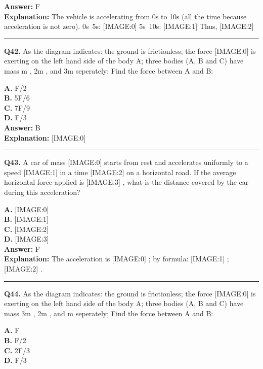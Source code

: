 \documentclass[12pt]{article}
\begin{document}
\textbf{Answer:} F \\
\textbf{Explanation:} The vehicle is accelerating from 0s to 10s (all the time because acceleration is not zero).
0s~5s:
[IMAGE:0]
5s~10s:
[IMAGE:1]
Thus,
[IMAGE:2]

\hrule
\vspace{1em}


\noindent
\textbf{Q42.} As the diagram indicates: the ground is frictionless; the force
[IMAGE:0]
is exerting on the left hand side of the body A; three bodies (A, B and C) have mass m
, 2m
, and 3m
seperately; Find the force between A and B:



\textbf{A.} F/2 \\
\textbf{B.} 5F/6 \\
\textbf{C.} 7F/9 \\
\textbf{D.} F/3 \\

\textbf{Answer:} B \\
\textbf{Explanation:} [IMAGE:0]

\hrule
\vspace{1em}


\noindent
\textbf{Q43.} A car of mass
[IMAGE:0]
starts from rest and accelerates uniformly to a speed
[IMAGE:1]
in a time
[IMAGE:2]
on a horizontal road. If the average horizontal force applied is
[IMAGE:3]
, what is the distance covered by the car during this acceleration?



\textbf{A.} [IMAGE:0] \\
\textbf{B.} [IMAGE:1] \\
\textbf{C.} [IMAGE:2] \\
\textbf{D.} [IMAGE:3] \\

\textbf{Answer:} F \\
\textbf{Explanation:} The acceleration is
[IMAGE:0]
; by formula:
[IMAGE:1]
;
[IMAGE:2]
.

\hrule
\vspace{1em}


\noindent
\textbf{Q44.} As the diagram indicates: the ground is frictionless; the force
[IMAGE:0]
is exerting on the left hand side of the body A; three bodies (A, B and C) have mass 3m
, 2m
, and m
seperately; Find the force between A and B:



\textbf{A.} F \\
\textbf{B.} F/2 \\
\textbf{C.} 2F/3 \\
\textbf{D.} F/3 \\
\end{document}
